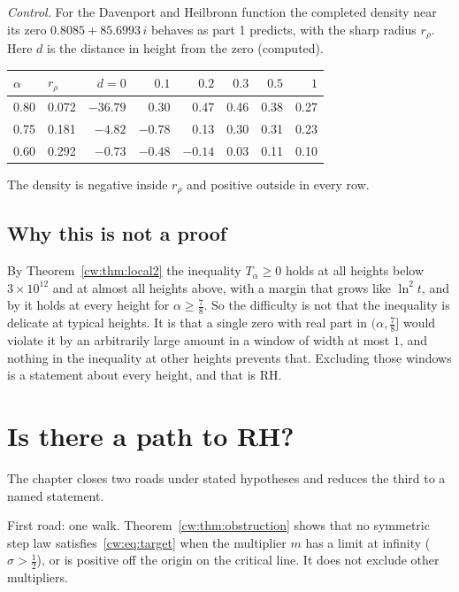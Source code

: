 \emph{Control.} For the Davenport and Heilbronn function the completed density near its zero $0.8085+85.6993\,i$ behaves as part 1 predicts, with the sharp radius $r_\rho$. Here $d$ is the distance in height from the zero (computed).
\begin{center}
\small
\begin{tabular}{llrrrrrr}
\toprule
$\alpha$ & $r_\rho$ & $d=0$ & $0.1$ & $0.2$ & $0.3$ & $0.5$ & $1$\\
\midrule
0.80 & 0.072 & $-36.79$ & 0.30 & 0.47 & 0.46 & 0.38 & 0.27\\
0.75 & 0.181 & $-4.82$ & $-0.78$ & 0.13 & 0.30 & 0.31 & 0.23\\
0.60 & 0.292 & $-0.73$ & $-0.48$ & $-0.14$ & 0.03 & 0.11 & 0.10\\
\bottomrule
\end{tabular}
\end{center}
The density is negative inside $r_\rho$ and positive outside in every row.

\subsection{Why this is not a proof}
By Theorem~\ref{cw:thm:local2} the inequality $T_\alpha\ge0$ holds at all heights below $3\times10^{12}$ and at almost all heights above, with a margin that grows like $\ln^2t$, and by \cite{OAI26a} it holds at every height for $\alpha\ge\frac78$. So the difficulty is not that the inequality is delicate at typical heights. It is that a single zero with real part in $(\alpha,\frac78]$ would violate it by an arbitrarily large amount in a window of width at most $1$, and nothing in the inequality at other heights prevents that. Excluding those windows is a statement about every height, and that is RH.

\section{Is there a path to RH?}\label{cw:sec:path}

The chapter closes two roads under stated hypotheses and reduces the third to a named statement.

First road: one walk. Theorem~\ref{cw:thm:obstruction} shows that no symmetric step law satisfies~\eqref{cw:eq:target} when the multiplier $m$ has a limit at infinity ($\sigma>\frac12$), or is positive off the origin on the critical line. It does not exclude other multipliers.

